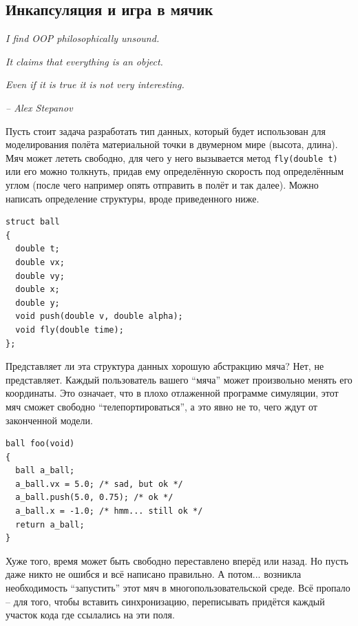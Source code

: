 \documentclass[a4paper,12pt,oneside]{article}
\newif\ifanswers
\begin{document}
\ifanswers
Правильный ответ: да, через явное приведение типов. Но лучше так не делать, это UB.
\fi

\pagebreak
\subsection{Инкапсуляция и игра в мячик}\label{Encapsulation}

\hfill\textit{I find OOP philosophically unsound.}

\hfill\textit{It claims that everything is an object.}

\hfill\textit{Even if it is true it is not very interesting.} {\vspace{0.5em}}

\hfill\textit{-- Alex Stepanov}

Пусть стоит задача разработать тип данных, который будет использован для моделирования полёта материальной точки в двумерном мире (высота, длина). Мяч может лететь свободно, для чего у него вызывается метод \lstinline!fly(double t)! или его можно толкнуть, придав ему определённую скорость под определённым углом (после чего например опять отправить в полёт и так далее). Можно написать определение структуры, вроде приведенного ниже.

\begin{lstlisting}
struct ball
{
  double t;
  double vx;
  double vy;
  double x;
  double y;
  void push(double v, double alpha);
  void fly(double time);
};
\end{lstlisting}

Представляет ли эта структура данных хорошую абстракцию мяча? Нет, не представляет. Каждый пользователь вашего ``мяча'' может произвольно менять его координаты. Это означает, что в плохо отлаженной программе симуляции, этот мяч сможет свободно ``телепортироваться'', а это явно не то, чего ждут от законченной модели. 

\begin{lstlisting}
ball foo(void)
{
  ball a_ball;
  a_ball.vx = 5.0; /* sad, but ok */
  a_ball.push(5.0, 0.75); /* ok */
  a_ball.x = -1.0; /* hmm... still ok */  
  return a_ball;
}
\end{lstlisting}

Хуже того, время может быть свободно переставлено вперёд или назад. Но пусть даже никто не ошибся и всё написано правильно. А потом... возникла необходимость ``запустить'' этот мяч в многопользовательской среде. Всё пропало – для того, чтобы вставить синхронизацию, переписывать придётся каждый участок кода где ссылались на эти поля.
\end{document}

